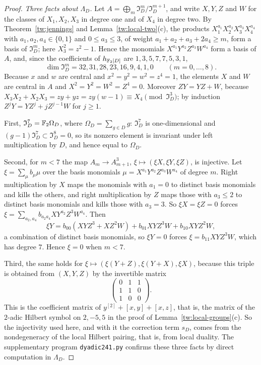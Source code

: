\begin{proof}
\emph{Three facts about $\Lambda_D$.} Let $A=\bigoplus_m\mathfrak I_D^m/\mathfrak I_D^{m+1}$,
and write $X,Y,Z$ and $W$ for the classes of $X_1,X_2,X_3$ in degree one and
of $X_4$ in degree two. By Theorem~\ref{tw:jennings} and
Lemma~\ref{tw:local-two}(c), the products
$X_1^{a_1}X_2^{a_2}X_3^{a_3}X_4^{a_4}$ with $a_1,a_2,a_4\in\{0,1\}$ and
$0\le a_3\le3$, of weight $a_1+a_2+a_3+2a_4\ge m$, form a basis of
$\mathfrak I_D^m$; here $X_3^2=z^2-1$. Hence the monomials
$X^{a_1}Y^{a_2}Z^{a_3}W^{a_4}$ form a basis of $A$, and, since the
coefficients of $h_{\mathbb F_2[D]}$ are $1,3,5,7,7,5,3,1$,
\[
 \dim\mathfrak I_D^m=32,31,28,23,16,9,4,1,0\qquad(m=0,\dots,8).
\]
Because $x$ and $w$ are central and $x^2=y^2=w^2=z^4=1$, the elements $X$
and $W$ are central in $A$ and $X^2=Y^2=W^2=Z^4=0$. Moreover $ZY=YZ+W$,
because $X_3X_2+X_2X_3=zy+yz=zy(w-1)\equiv X_4\pmod{\mathfrak I_D^3}$; by
induction $Z^jY=YZ^j+jZ^{j-1}W$ for $j\ge1$.

First, $\mathfrak I_D^7=\mathbb F_2\Omega_D$, where $\Omega_D=\sum_{g\in D}g$:
$\mathfrak I_D^7$ is one-dimensional and $(g-1)\mathfrak I_D^7\subset\mathfrak I_D^8=0$,
so its nonzero element is invariant under left multiplication by $D$, and
hence equal to $\Omega_D$.

Second, for $m<7$ the map $A_m\to A_{m+1}^3$, $\xi\mapsto(\xi X,\xi Y,\xi Z)$,
is injective. Let $\xi=\sum_\mu b_\mu\mu$ over the basis monomials
$\mu=X^{a_1}Y^{a_2}Z^{a_3}W^{a_4}$ of degree $m$. Right multiplication by $X$
maps the monomials with $a_1=0$ to distinct basis monomials and kills the
others, and right multiplication by $Z$ maps those with $a_3\le2$ to
distinct basis monomials and kills those with $a_3=3$. So $\xi X=\xi Z=0$
forces $\xi=\sum_{a_2,a_4}b_{a_2a_4}XY^{a_2}Z^3W^{a_4}$. Then
\[
 \xi Y=b_{00}(XYZ^3+XZ^2W)+b_{01}XYZ^3W+b_{10}XYZ^2W,
\]
a combination of distinct basis monomials, so $\xi Y=0$ forces
$\xi=b_{11}XYZ^3W$, which has degree $7$. Hence $\xi=0$ when $m<7$.

Third, the same holds for $\xi\mapsto(\xi(Y+Z),\xi(Y+X),\xi X)$, because this
triple is obtained from $(X,Y,Z)$ by the invertible matrix
\[
 \begin{pmatrix}0&1&1\\1&1&0\\1&0&0\end{pmatrix}.
\]
This is the coefficient matrix of $y^{[2]}+[x,y]+[x,z]$, that is, the matrix
of the $2$-adic Hilbert symbol on $2,-5,5$ in the proof of
Lemma~\ref{tw:local-groups}(c). So the injectivity used here, and with it
the correction term $s_D$, comes from the nondegeneracy of the local Hilbert pairing,
that is, from local duality. The supplementary program \texttt{dyadic241.py}
confirms these three facts by direct computation in $\Lambda_D$.


\end{proof}
